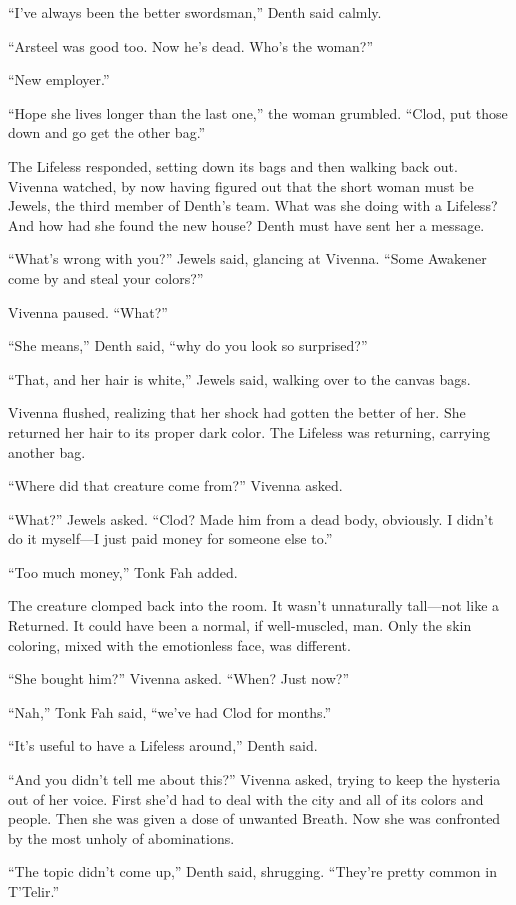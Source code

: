 “I’ve always been the better swordsman,” Denth said calmly.

“Arsteel was good too. Now he’s dead. Who’s the woman?”

“New employer.”

“Hope she lives longer than the last one,” the woman grumbled. “Clod, put those down and go get the other bag.”

The Lifeless responded, setting down its bags and then walking back out. Vivenna watched, by now having figured out that the short woman must be Jewels, the third member of Denth’s team. What was she doing with a Lifeless? And how had she found the new house? Denth must have sent her a message.

“What’s wrong with you?” Jewels said, glancing at Vivenna. “Some Awakener come by and steal your colors?”

Vivenna paused. “What?”

“She means,” Denth said, “why do you look so surprised?”

“That, and her hair is white,” Jewels said, walking over to the canvas bags.

Vivenna flushed, realizing that her shock had gotten the better of her. She returned her hair to its proper dark color. The Lifeless was returning, carrying another bag.

“Where did that creature come from?” Vivenna asked.

“What?” Jewels asked. “Clod? Made him from a dead body, obviously. I didn’t do it myself—I just paid money for someone else to.”

“Too much money,” Tonk Fah added.

The creature clomped back into the room. It wasn’t unnaturally tall—not like a Returned. It could have been a normal, if well-muscled, man. Only the skin coloring, mixed with the emotionless face, was different.

“She bought him?” Vivenna asked. “When? Just now?”

“Nah,” Tonk Fah said, “we’ve had Clod for months.”

“It’s useful to have a Lifeless around,” Denth said.

“And you didn’t tell me about this?” Vivenna asked, trying to keep the hysteria out of her voice. First she’d had to deal with the city and all of its colors and people. Then she was given a dose of unwanted Breath. Now she was confronted by the most unholy of abominations.

“The topic didn’t come up,” Denth said, shrugging. “They’re pretty common in T’Telir.”

